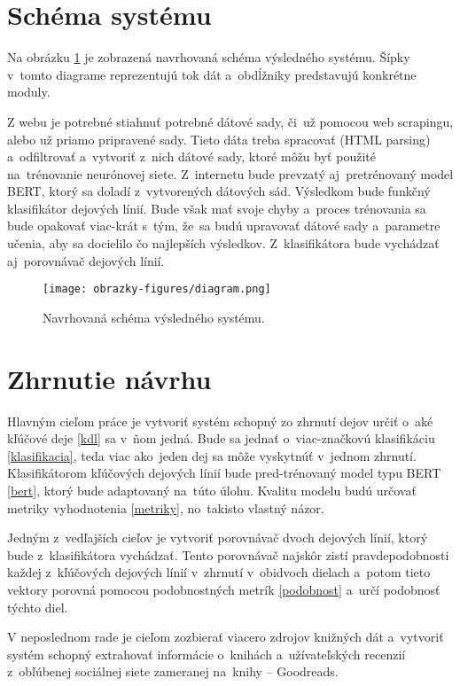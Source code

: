 \section{Schéma systému}

Na obrázku \ref{schema} je zobrazená navrhovaná schéma výsledného systému. Šípky v~tomto diagrame reprezentujú tok dát a~obdĺžniky predstavujú konkrétne moduly.

Z webu je potrebné stiahnuť potrebné dátové sady, či~už pomocou web scrapingu, alebo už priamo pripravené sady. Tieto dáta treba spracovať (HTML parsing) a~odfiltrovať a~vytvoriť z~nich dátové sady, ktoré môžu byť použité na~trénovanie neurónovej siete. Z~internetu bude prevzatý aj~pretrénovaný model BERT, ktorý sa doladí z~vytvorených dátových sád. Výsledkom bude funkčný klasifikátor dejových línií. Bude však mať svoje chyby a~proces trénovania sa bude opakovať viac-krát s~tým, že~sa budú upravovať dátové sady a~parametre učenia, aby sa docielilo čo najlepších výsledkov. Z~klasifikátora bude vychádzať aj~porovnávač dejových línií.

\begin{figure}[ht!]
	\centering
	\texttt{[image: obrazky-figures/diagram.png]}
	\caption{Navrhovaná schéma výsledného systému.}
	\label{schema}
\end{figure}

\section{Zhrnutie návrhu}

Hlavným cieľom práce je vytvoriť systém schopný zo zhrnutí dejov určiť o~aké kľúčové deje \ref{kdl} sa v~ňom jedná. Bude sa jednať o~viac-značkovú klasifikáciu \ref{klasifikacia}, teda viac ako~jeden dej sa môže vyskytnúť v~jednom zhrnutí. Klasifikátorom kľúčových dejových línií bude pred-trénovaný model typu BERT \ref{bert}, ktorý bude adaptovaný na~túto úlohu. Kvalitu modelu budú určovať metriky vyhodnotenia \ref{metriky}, no~takisto vlastný názor.

Jedným z~vedľajších cieľov je vytvoriť porovnávač dvoch dejových línií, ktorý bude z~klasifikátora vychádzať. Tento porovnávač najskôr zistí pravdepodobnosti každej z~kľúčových dejových línií v~zhrnutí  v~obidvoch dielach a~potom tieto vektory porovná pomocou podobnostných metrík \ref{podobnost} a~určí podobnosť týchto diel.

V neposlednom rade je cieľom zozbierať viacero zdrojov knižných dát a~vytvoriť systém schopný extrahovať informácie o~knihách a~užívateľských recenzií z~obľúbenej sociálnej siete zameranej na~knihy -- Goodreads.

